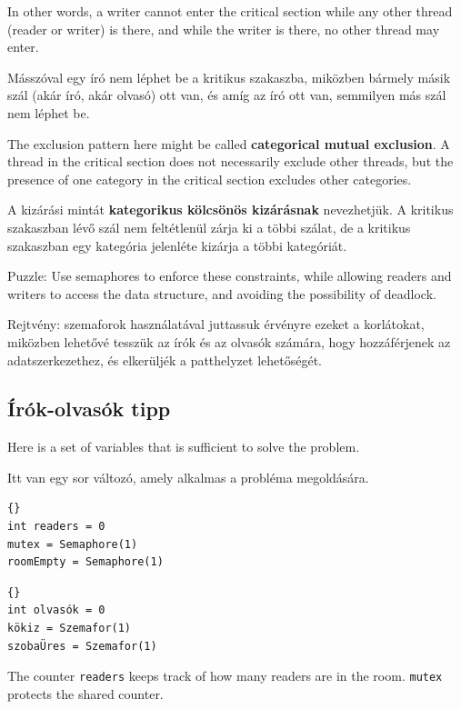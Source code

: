 \documentclass{book}
\newcommand{\clearemptydoublepage}{\newpage\cleardoublepage}
\begin{document}
In other words, a writer cannot enter the critical section while
any other thread (reader or writer) is there, and while the writer
is there, no other thread may enter.

Másszóval egy író nem léphet be a kritikus szakaszba, miközben
bármely másik szál (akár író, akár olvasó) ott van, és amíg
az író ott van, semmilyen más szál nem léphet be.

The exclusion pattern here might be called {\bf categorical
mutual exclusion}.  A thread in the critical section
does not necessarily exclude other threads, but the presence
of one category in the critical section excludes other
categories.

A kizárási mintát {\bf kategorikus kölcsönös kizárásnak} nevezhetjük.
A kritikus szakaszban lévő szál nem feltétlenül zárja ki a többi
szálat, de a kritikus szakaszban egy kategória jelenléte kizárja a
többi kategóriát.

Puzzle: Use semaphores to enforce these constraints, while allowing
readers and writers to access the data structure, and avoiding
the possibility of deadlock.

Rejtvény: szemaforok használatával juttassuk érvényre ezeket
a korlátokat, miközben lehetővé tesszük az írók és az olvasók számára,
hogy hozzáférjenek az adatszerkezethez, és elkerüljék
a patthelyzet lehetőségét.




\clearemptydoublepage
\subsection{Írók-olvasók tipp}

Here is a set of variables that is sufficient to solve the
problem.

Itt van egy sor változó, amely alkalmas a probléma megoldására.

\begin{lstlisting}[title={Readers-writers initialization}]{}
int readers = 0
mutex = Semaphore(1)
roomEmpty = Semaphore(1)
\end{lstlisting}

\begin{lstlisting}[title={Írók-olvasók inicializáció}]{}
int olvasók = 0
kökiz = Szemafor(1)
szobaÜres = Szemafor(1)
\end{lstlisting}

The counter {\tt readers} keeps track of how many readers
are in the room.  {\tt mutex} protects the shared counter.
\end{document}

